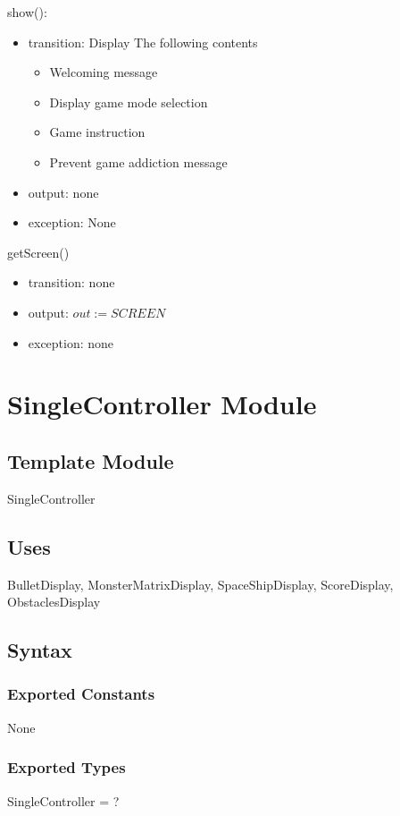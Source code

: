 \documentclass[12pt]{article}
\begin{document}
\noindent show():
\begin{itemize}
    \item transition: Display The following contents
    \begin{itemize}
    \item Welcoming message
    \item Display game mode selection
    \item Game instruction
    \item Prevent game addiction message
    \end{itemize}
    \item output: none
    \item exception: None
\end{itemize}

\noindent getScreen()
\begin{itemize}
\item transition: none
\item output: $out := SCREEN$
\item exception: none
\end{itemize}
\newpage

\section{SingleController Module}

\subsection*{Template Module}
SingleController

\subsection*{Uses}
BulletDisplay, MonsterMatrixDisplay, SpaceShipDisplay, ScoreDisplay,
ObstaclesDisplay

\subsection*{Syntax}
\subsubsection*{Exported Constants}
None
\subsubsection*{Exported Types}
SingleController = ?
\end{document}
